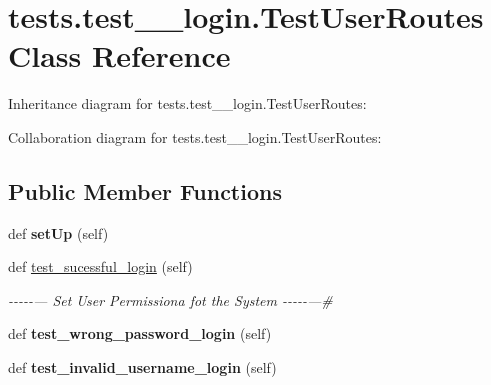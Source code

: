 \hypertarget{classtests_1_1test__4__login_1_1_test_user_routes}{}\section{tests.\+test\+\_\+\_\+login.\+Test\+User\+Routes Class Reference}
\label{classtests_1_1test__4__login_1_1_test_user_routes}


Inheritance diagram for tests.\+test\+\_\+\_\+login.\+Test\+User\+Routes\+:


Collaboration diagram for tests.\+test\+\_\+\_\+login.\+Test\+User\+Routes\+:
\subsection*{Public Member Functions}
\begin{DoxyCompactItemize}
\item 
\mbox{\label{classtests_1_1test__4__login_1_1_test_user_routes_a7106c7acb80baac2e2e4b83cef7df6b0}} 
def {\bfseries set\+Up} (self)
\item 
\mbox{\label{classtests_1_1test__4__login_1_1_test_user_routes_a7acac7d6199d077074c28da30a5b1d1d}} 
def \hyperlink{classtests_1_1test__4__login_1_1_test_user_routes_a7acac7d6199d077074c28da30a5b1d1d}{test\+\_\+sucessful\+\_\+login} (self)
\begin{DoxyCompactList}\small\item\em -\/-\/-\/-\/-\/--- Set User Permissiona fot the System -\/-\/-\/-\/-\/---\# \end{DoxyCompactList}\item 
\mbox{\label{classtests_1_1test__4__login_1_1_test_user_routes_ac5412aba5f3ec6a3099688826f5d8e8d}} 
def {\bfseries test\+\_\+wrong\+\_\+password\+\_\+login} (self)
\item 
\mbox{\label{classtests_1_1test__4__login_1_1_test_user_routes_a01559d5c38a7c74d5a1779fb539fada4}} 
def {\bfseries test\+\_\+invalid\+\_\+username\+\_\+login} (self)
\end{DoxyCompactItemize}
